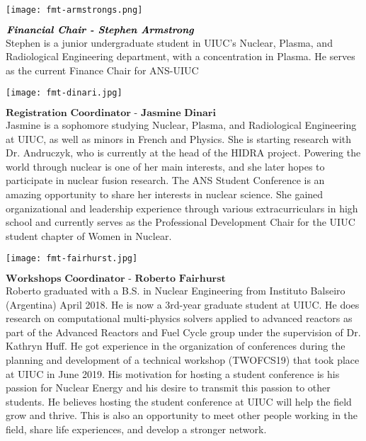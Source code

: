 \begin{minipage}{0.25\textwidth}
	\centering
	\texttt{[image: fmt-armstrongs.png]}
\end{minipage}
\begin{minipage}{0.73\textwidth}
	$\textbf{\textit{Financial Chair - Stephen Armstrong}}$\\
Stephen is a junior undergraduate student in UIUC's Nuclear, Plasma, and Radiological Engineering department, with a concentration in Plasma. He serves as the current Finance Chair for ANS-UIUC
\end{minipage}

\begin{minipage}{0.25\textwidth}
	\centering
	\texttt{[image: fmt-dinari.jpg]}
\end{minipage}
\begin{minipage}{0.73\textwidth}
	$\textbf{Registration Coordinator - Jasmine Dinari}$\\
Jasmine is a sophomore studying Nuclear, Plasma, and Radiological Engineering at UIUC, as well as minors in French and Physics. She is starting research with Dr. Andruczyk, who is currently at the head of the HIDRA project. Powering the world through nuclear is one of her main interests, and she later hopes to participate in nuclear fusion research. The ANS Student Conference is an  amazing opportunity to share her interests in nuclear science. She gained organizational and leadership experience through various extracurriculars in high school and currently serves as the Professional Development Chair for the UIUC student chapter of Women in Nuclear.
\end{minipage}

\begin{minipage}{0.25\textwidth}
	\centering
	\texttt{[image: fmt-fairhurst.jpg]}
\end{minipage}
\begin{minipage}{0.73\textwidth}
	$\textbf{Workshops Coordinator - Roberto Fairhurst}$\\
Roberto graduated with a B.S. in Nuclear Engineering from Instituto Balseiro (Argentina) April 2018. He is now a 3rd-year graduate student at UIUC. He does research on computational multi-physics solvers applied to advanced reactors as part of the Advanced Reactors and Fuel Cycle group under the supervision of Dr. Kathryn Huff. He got experience in the organization of conferences during the planning and development of a technical workshop (TWOFCS19) that took place at UIUC in June 2019. His motivation for hosting a student conference is his passion for Nuclear Energy and his desire to transmit this passion to other students. He believes hosting the student conference at UIUC will help the field grow and thrive. This is also an opportunity to meet other people working in the field, share life experiences, and develop a stronger network.
\end{minipage}

